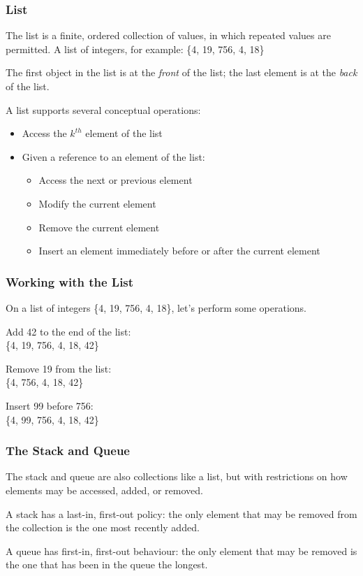 \begin{frame}
\frametitle{List}

The \alert{list} is a finite, ordered collection of values, in which repeated values are permitted. A list of integers, for example: \{4, 19, 756, 4, 18\}

The first object in the list is at the \textit{front} of the list; the last element is at the \textit{back} of the list.

A list supports several conceptual operations:
\begin{itemize}
	\item Access the $k^{th}$ element of the list
	\item Given a reference to an element of the list:
	\begin{itemize}
	\item Access the next or previous element
	\item Modify the current element
	\item Remove the current element
	\item Insert an element immediately before or after the current element
	\end{itemize}
\end{itemize}

\end{frame}


\begin{frame}
\frametitle{Working with the List}
On a list of integers \{4, 19, 756, 4, 18\}, let's perform some operations.

Add 42 to the end of the list: \\ \{4, 19, 756, 4, 18, 42\}

Remove 19 from the list: \\ \{4, 756, 4, 18, 42\}

Insert 99 before 756: \\ \{4, 99, 756, 4, 18, 42\}

\end{frame}

\begin{frame}
\frametitle{The Stack and Queue}
The \alert{stack} and \alert{queue} are also collections like a list, but with restrictions on how elements may be accessed, added, or removed.

A stack has a last-in, first-out policy: the only element that may be removed from the collection is the one most recently added.

A queue has first-in, first-out behaviour: the only element that may be removed is the one that has been in the queue the longest.

\end{frame}

